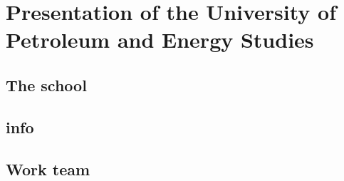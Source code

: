 \chapter{Presentation of the University of Petroleum and Energy Studies}


\section{The school}


\section{info}


\section{Work team}



